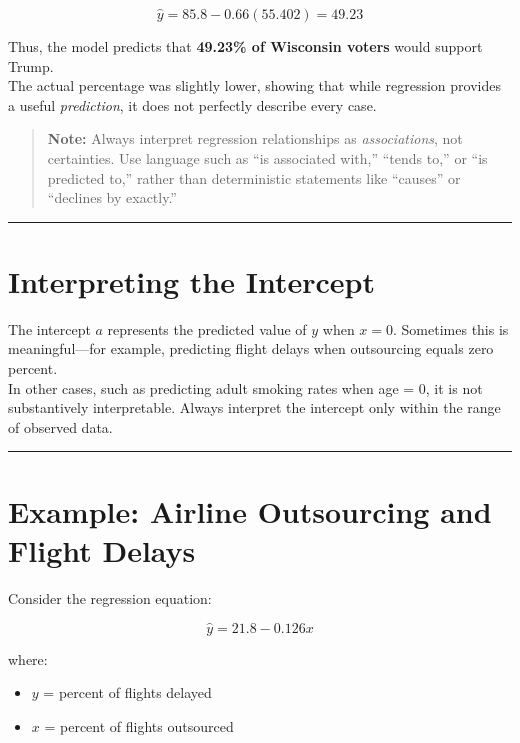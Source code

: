 \documentclass[
  letterpaper,
  DIV=11,
  numbers=noendperiod]{scrreprt}
\providecommand{\tightlist}{%
  \setlength{\itemsep}{0pt}\setlength{\parskip}{0pt}}
\begin{document}
\[
\hat{y} = 85.8 - 0.66(55.402) = 49.23
\]

Thus, the model predicts that \textbf{49.23\% of Wisconsin voters} would
support Trump.\\
The actual percentage was slightly lower, showing that while regression
provides a useful \emph{prediction}, it does not perfectly describe
every case.

\begin{quote}
\textbf{Note:} Always interpret regression relationships as
\emph{associations}, not certainties. Use language such as ``is
associated with,'' ``tends to,'' or ``is predicted to,'' rather than
deterministic statements like ``causes'' or ``declines by exactly.''
\end{quote}

\begin{center}\rule{0.5\linewidth}{0.5pt}\end{center}

\section{Interpreting the Intercept}\label{interpreting-the-intercept}

The intercept \(a\) represents the predicted value of \(y\) when
\(x = 0\). Sometimes this is meaningful---for example, predicting flight
delays when outsourcing equals zero percent.\\
In other cases, such as predicting adult smoking rates when age = 0, it
is not substantively interpretable. Always interpret the intercept only
within the range of observed data.

\begin{center}\rule{0.5\linewidth}{0.5pt}\end{center}

\section{Example: Airline Outsourcing and Flight
Delays}\label{example-airline-outsourcing-and-flight-delays}

Consider the regression equation:

\[
\hat{y} = 21.8 - 0.126x
\]

where:

\begin{itemize}
\tightlist
\item
  \(y\) = percent of flights delayed\\
\item
  \(x\) = percent of flights outsourced
\end{itemize}
\end{document}
